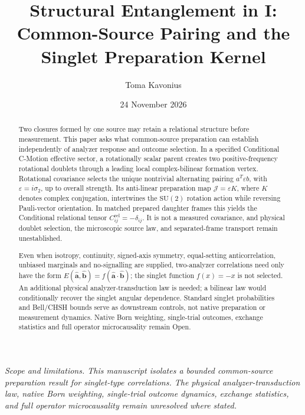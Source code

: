 \documentclass[11pt]{article}
\title{\textbf{Structural Entanglement in \cmotion{} I:}\\
Common-Source Pairing and the Singlet Preparation Kernel}
\author{Toma Kavonius}
\date{24 November 2026}
\theoremstyle{remark}
\newcommand{\SU}{\mathrm{SU}(2)}
\newcommand{\ahat}{\hat{\bm a}}
\newcommand{\bhat}{\hat{\bm b}}
\newcommand{\epsm}{\varepsilon}
\newcommand{\Jmap}{\mathcal J}
\newcommand{\Crel}{C^{\mathrm{rel}}}
\begin{document}
\maketitle

\begin{center}
\small\itshape
Scope and limitations.  This manuscript isolates a bounded common-source preparation
result for singlet-type correlations.  The physical analyzer-transduction law,
native Born weighting, single-trial outcome dynamics, exchange statistics, and
full operator microcausality remain unresolved where stated.
\end{center}
\vspace{0.6em}

\begin{abstract}
Two closures formed by one source may retain a relational structure before
measurement. This paper asks what common-source preparation can establish
independently of analyzer response and outcome selection. In a specified
Conditional C-Motion effective sector, a rotationally scalar parent creates
two positive-frequency rotational doublets through a leading local
complex-bilinear formation vertex. Rotational covariance selects the unique
nontrivial alternating pairing $a^T\epsm b$, with $\epsm=i\sigma_2$, up to
overall strength. Its anti-linear preparation map $\Jmap=\epsm K$,
where $K$ denotes complex conjugation, intertwines
the $\SU$ rotation action while reversing Pauli-vector orientation. In
matched prepared daughter frames this yields the Conditional relational
tensor $\Crel_{ij}=-\delta_{ij}$. It is not a measured covariance, and
physical doublet selection, the microscopic source law, and separated-frame
transport remain unestablished.

Even when isotropy, continuity, signed-axis symmetry, equal-setting
anticorrelation, unbiased marginals and no-signalling are supplied,
two-analyzer correlations need only have the form
$E(\ahat,\bhat)=f(\ahat\cdot\bhat)$; the singlet function $f(x)=-x$
is not selected. An additional physical analyzer-transduction law is needed;
a bilinear law would conditionally recover the singlet angular dependence.
Standard singlet probabilities and Bell/CHSH bounds serve as downstream
controls, not native preparation or measurement dynamics. Native Born
weighting, single-trial outcomes, exchange statistics and full operator
microcausality remain Open.
\end{abstract}


\end{document}
